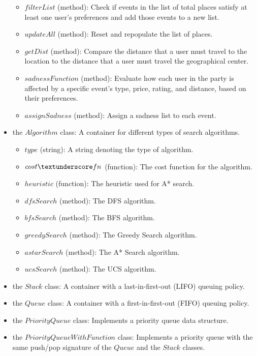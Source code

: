 \documentclass[11pt]{article}
\begin{document}
\begin{itemize}
\begin{itemize}
        \item $filterList$ (method): Check if events in the list of total places satisfy at least one user's preferences and add those events to a new list.
        \item $updateAll$ (method): Reset and repopulate the list of places.
        \item $getDist$ (method): Compare the distance that a user must travel to the location to the distance that a user must travel the geographical center.
        \item $sadnessFunction$ (method): Evaluate how each user in the party is affected by a specific event's type, price, rating, and distance, based on their preferences.
        \item $assignSadness$ (method): Assign a sadness list to each event.
    \end{itemize}
    \item the $Algorithm$ class: A container for different types of search algorithms.
    \begin{itemize}
        \item $type$ (string): A string denoting the type of algorithm.
        \item $cost\textunderscore fn$ (function): The cost function for the algorithm.
        \item $heuristic$ (function): The heuristic used for A* search.
        \item $dfsSearch$ (method): The DFS algorithm.
        \item $bfsSearch$ (method): The BFS algorithm.
        \item $greedySearch$ (method): The Greedy Search algorithm.
        \item $astarSearch$ (method): The A* Search algorithm.
        \item $ucsSearch$ (method): The UCS algorithm.
    \end{itemize}
    \item the $Stack$ class: A container with a last-in-first-out (LIFO) queuing policy.
    \item the $Queue$ class: A container with a first-in-first-out (FIFO) queuing policy.
    \item the $PriorityQueue$ class: Implements a priority queue data structure.
    \item the $PriorityQueueWithFunction$ class: Implements a priority queue with the same push/pop signature of the $Queue$ and the $Stack$ classes.
\end{itemize}
\end{document}
